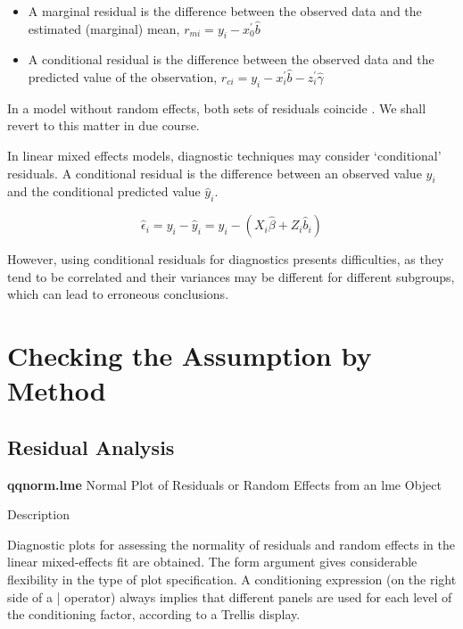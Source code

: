\documentclass[12pt, a4paper]{report}
\theoremstyle{plain}
\theoremstyle{definition}
\theoremstyle{remark}
\begin{document}
\begin{itemize}
	\item A marginal residual is the difference between the observed data and the estimated (marginal) mean, $r_{mi} = y_i - x_0^{\prime} \hat{b}$
	\item A conditional residual is the difference between the observed data and the predicted value of the observation,
	$r_{ci} = y_i - x_i^{\prime} \hat{b} - z_i^{\prime} \hat{\gamma}$	
\end{itemize} 
In a model without random effects, both sets of
residuals coincide \citep{schab} . We shall revert to this matter in due course.







In linear mixed effects models, diagnostic techniques may consider `conditional' residuals. A conditional residual is the difference between an observed value $y_{i}$ and the conditional predicted value $\hat{y}_{i} $.

\[ \hat{\epsilon}_{i} = y_{i} - \hat{y}_{i} = y_{i} - ( X_{i}\hat{\beta} + Z_{i}\hat{b}_{i}) \]

However, using conditional residuals for diagnostics presents difficulties, as they tend to be correlated and their variances may be different for different subgroups, which can lead to erroneous conclusions.


\newpage

\section{Checking the Assumption by Method}


\subsection{Residual Analysis}


\textbf{qqnorm.lme}
Normal Plot of Residuals or Random Effects from an lme Object

Description

Diagnostic plots for assessing the normality of residuals and random effects in the linear mixed-effects fit are obtained. 
The form argument gives considerable flexibility in the type of plot specification. 
A conditioning expression (on the right side of a | operator) always implies that different panels are used 
for each level of the conditioning factor, according to a Trellis display.
\end{document}
